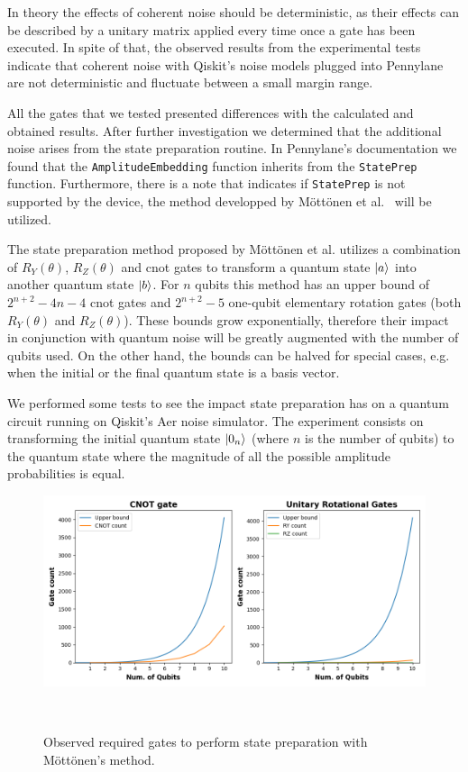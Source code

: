 In theory the effects of coherent noise should be deterministic,
as their effects can be described by a unitary matrix applied
every time once a gate has been executed. In spite of that,
the observed results from the experimental tests indicate that
coherent noise with Qiskit's noise models plugged into Pennylane
are not deterministic and fluctuate between a small margin range. \

All the gates that we tested presented differences with the
calculated and obtained results. After further investigation
we determined that the additional noise arises from the state
preparation routine. In Pennylane's documentation we found that
the \colorbox{inline_gray}{\lstinline|AmplitudeEmbedding|} function
inherits from the \colorbox{inline_gray}{\lstinline|StatePrep|}
function. Furthermore, there is a note that indicates
if \colorbox{inline_gray}{\lstinline|StatePrep|} is not supported
by the device, the method developped by Möttönen et al.~\cite{mottonen_transformation_2004}
will be utilized. \

The state preparation method proposed by Möttönen et al. utilizes a
combination of \(R_{Y}(\theta)\), \(R_{Z}(\theta)\) and \ac{cnot}
gates to transform a quantum state \(\ket{a}\) into another quantum state
\(\ket{b}\). For \(n\) qubits this method has an upper bound of
\(2^{n+2}-4n-4\) \ac{cnot} gates and \(2^{n+2}-5\) one-qubit elementary
rotation gates (both \(R_{Y}(\theta)\) and \(R_{Z}(\theta)\)). These
bounds grow exponentially, therefore their impact in conjunction with
quantum noise will be greatly augmented with the number of qubits used.
On the other hand, the bounds can be halved for special cases, e.g. when
the initial or the final quantum state is a basis vector. \

We performed some tests to see the impact state preparation has on
a quantum circuit running on Qiskit's Aer noise simulator. The experiment
consists on transforming the initial quantum state \(\ket{0_{n}}\)
(where \(n\) is the number of qubits) to the quantum state where the
magnitude of all the possible amplitude probabilities is equal. \

\begin{figure}[h!]
  \includegraphics[scale=0.55]{figures/state-prep-gates-count.png}
  \centering
  \caption{Observed required gates to perform state preparation with Möttönen's method.}
~\label{fig:state_prep}
\end{figure} \

